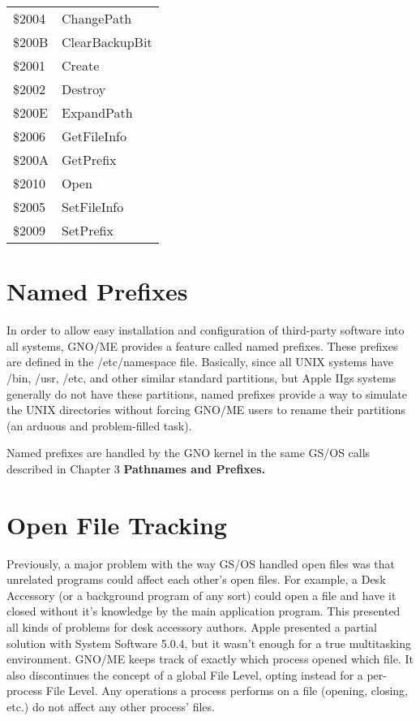 \documentclass{report}
\begin{document}
\begin{tabular}{ll}

\index{ChangePath}
\index{ClearBackupBit}
\index{Create}
\index{Destroy}
\index{ExpandPath}
\index{GetFileInfo}
\index{GetPrefix}
\index{Open}
\index{SetFileInfo}
\index{SetPrefix}

\$2004 & ChangePath \\
\$200B & ClearBackupBit \\
\$2001 & Create \\
\$2002 & Destroy \\
\$200E & ExpandPath \\
\$2006 & GetFileInfo \\
\$200A & GetPrefix \\
\$2010 & Open \\
\$2005 & SetFileInfo \\
\$2009 & SetPrefix \\

\end{tabular}


\section{Named Prefixes}

In order to allow easy installation and
configuration of third-party software into all systems, GNO/ME
provides a feature called named prefixes. These prefixes are
defined in the 
/etc/namespace file. Basically, since all UNIX
systems have /bin, /usr, /etc, and other similar standard
partitions, but Apple IIgs systems generally do not have these
partitions, named prefixes provide a way to simulate the UNIX
directories without forcing GNO/ME users to rename their
partitions (an arduous and problem-filled task).

Named prefixes are handled by the GNO
kernel in the same GS/OS calls described in Chapter 3 \bf Pathnames
and Prefixes\rm.

\section{Open File Tracking}

Previously, a major problem with the way
GS/OS handled open files was that unrelated programs could affect
each other's open files. For example, a Desk Accessory (or a
background program of any sort) could open a file and have it
closed without it's knowledge by the main application program.
This presented all kinds of problems for desk accessory authors.
Apple presented a partial solution with System Software 5.0.4,
but it wasn't enough for a true multitasking environment. GNO/ME
keeps track of exactly which process opened which file. It also
discontinues the concept of a global File Level, opting instead
for a per-process File Level. Any operations a process performs
on a file (opening, closing, etc.) do not affect any other
process' files.
\end{document}
